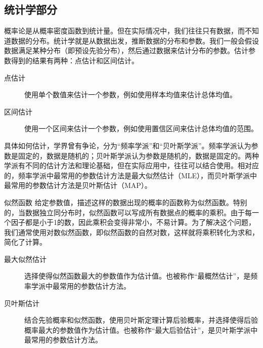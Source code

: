 \subsection{统计学部分}

概率论是从概率密度函数到统计量。但在实际情况中，我们往往只有数据，而不知道数据的分布。统计学就是从数据出发，推断数据的分布和参数。我们一般会假设数据满足某种分布（即预设先验分布），然后通过数据来估计分布的参数。估计参数得到的结果有两种：点估计和区间估计。
\begin{description}
    \item[点估计] 使用单个数值来估计一个参数，例如使用样本均值来估计总体均值。
    \item[区间估计] 使用一个区间来估计一个参数，例如使用置信区间来估计总体均值的范围。
\end{description}

具体如何估计，学界曾有争论，分为“频率学派”和“贝叶斯学派”。频率学派认为参数是固定的，数据是随机的；贝叶斯学派认为参数是随机的，数据是固定的。两种学派有不同的估计方法和理论基础，但在实际应用中，往往可以结合使用。相对应的，频率学派中最常用的参数估计方法是最大似然估计（MLE），而贝叶斯学派中最常用的参数估计方法是贝叶斯估计（MAP）。
\begin{definition}{似然函数}{}
    给定参数值，描述这样的数据出现的概率的函数称为似然函数。特别的，当数据独立同分布时，似然函数可以写成所有数据点的概率的乘积。由于每一个因子都是小于1的数，因此乘积会变得非常小，不易计算。为了解决这个问题，我们通常使用对数似然函数，即似然函数的自然对数，这样就将乘积转化为求和，简化了计算。
\end{definition}

\begin{description}
    \item[最大似然估计] 选择使得似然函数最大的参数值作为估计值。也被称作“最概然估计”，是频率学派中最常用的参数估计方法。
    \item[贝叶斯估计] 结合先验概率和似然函数，使用贝叶斯定理计算后验概率，并选择使得后验概率最大的参数值作为估计值。也被称作“最大后验估计”，是贝叶斯学派中最常用的参数估计方法。
\end{description}

